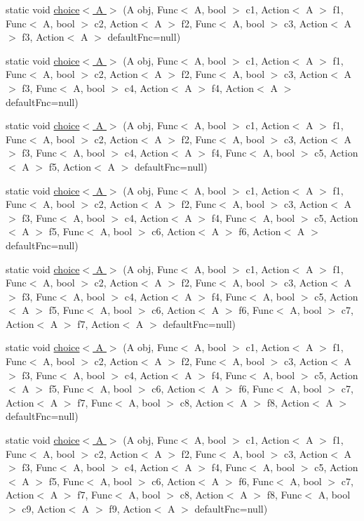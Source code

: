 \begin{DoxyCompactItemize}
\item 
static void \hyperlink{class_prelude_a41c5503a76c13aeff3042186cfa75adb}{choice$<$ A $>$} (A obj, Func$<$ A, bool $>$ c1, Action$<$ A $>$ f1, Func$<$ A, bool $>$ c2, Action$<$ A $>$ f2, Func$<$ A, bool $>$ c3, Action$<$ A $>$ f3, Action$<$ A $>$ default\+Fnc=null)
\item 
static void \hyperlink{class_prelude_a01e341dffdf8df45543527b8c7481250}{choice$<$ A $>$} (A obj, Func$<$ A, bool $>$ c1, Action$<$ A $>$ f1, Func$<$ A, bool $>$ c2, Action$<$ A $>$ f2, Func$<$ A, bool $>$ c3, Action$<$ A $>$ f3, Func$<$ A, bool $>$ c4, Action$<$ A $>$ f4, Action$<$ A $>$ default\+Fnc=null)
\item 
static void \hyperlink{class_prelude_aff471f3d5bd4c607ef51a48e3655a517}{choice$<$ A $>$} (A obj, Func$<$ A, bool $>$ c1, Action$<$ A $>$ f1, Func$<$ A, bool $>$ c2, Action$<$ A $>$ f2, Func$<$ A, bool $>$ c3, Action$<$ A $>$ f3, Func$<$ A, bool $>$ c4, Action$<$ A $>$ f4, Func$<$ A, bool $>$ c5, Action$<$ A $>$ f5, Action$<$ A $>$ default\+Fnc=null)
\item 
static void \hyperlink{class_prelude_ac2ea73cb6a9dcac1d4e821a3901d283d}{choice$<$ A $>$} (A obj, Func$<$ A, bool $>$ c1, Action$<$ A $>$ f1, Func$<$ A, bool $>$ c2, Action$<$ A $>$ f2, Func$<$ A, bool $>$ c3, Action$<$ A $>$ f3, Func$<$ A, bool $>$ c4, Action$<$ A $>$ f4, Func$<$ A, bool $>$ c5, Action$<$ A $>$ f5, Func$<$ A, bool $>$ c6, Action$<$ A $>$ f6, Action$<$ A $>$ default\+Fnc=null)
\item 
static void \hyperlink{class_prelude_aa6eb10859e6b8a7b75a3250e31b33c24}{choice$<$ A $>$} (A obj, Func$<$ A, bool $>$ c1, Action$<$ A $>$ f1, Func$<$ A, bool $>$ c2, Action$<$ A $>$ f2, Func$<$ A, bool $>$ c3, Action$<$ A $>$ f3, Func$<$ A, bool $>$ c4, Action$<$ A $>$ f4, Func$<$ A, bool $>$ c5, Action$<$ A $>$ f5, Func$<$ A, bool $>$ c6, Action$<$ A $>$ f6, Func$<$ A, bool $>$ c7, Action$<$ A $>$ f7, Action$<$ A $>$ default\+Fnc=null)
\item 
static void \hyperlink{class_prelude_a2d8d4e10c5554ff9cf9c6821d9a88bb2}{choice$<$ A $>$} (A obj, Func$<$ A, bool $>$ c1, Action$<$ A $>$ f1, Func$<$ A, bool $>$ c2, Action$<$ A $>$ f2, Func$<$ A, bool $>$ c3, Action$<$ A $>$ f3, Func$<$ A, bool $>$ c4, Action$<$ A $>$ f4, Func$<$ A, bool $>$ c5, Action$<$ A $>$ f5, Func$<$ A, bool $>$ c6, Action$<$ A $>$ f6, Func$<$ A, bool $>$ c7, Action$<$ A $>$ f7, Func$<$ A, bool $>$ c8, Action$<$ A $>$ f8, Action$<$ A $>$ default\+Fnc=null)
\item 
static void \hyperlink{class_prelude_a1658a302ba8390ceb59847d974687798}{choice$<$ A $>$} (A obj, Func$<$ A, bool $>$ c1, Action$<$ A $>$ f1, Func$<$ A, bool $>$ c2, Action$<$ A $>$ f2, Func$<$ A, bool $>$ c3, Action$<$ A $>$ f3, Func$<$ A, bool $>$ c4, Action$<$ A $>$ f4, Func$<$ A, bool $>$ c5, Action$<$ A $>$ f5, Func$<$ A, bool $>$ c6, Action$<$ A $>$ f6, Func$<$ A, bool $>$ c7, Action$<$ A $>$ f7, Func$<$ A, bool $>$ c8, Action$<$ A $>$ f8, Func$<$ A, bool $>$ c9, Action$<$ A $>$ f9, Action$<$ A $>$ default\+Fnc=null)

\end{DoxyCompactItemize}
